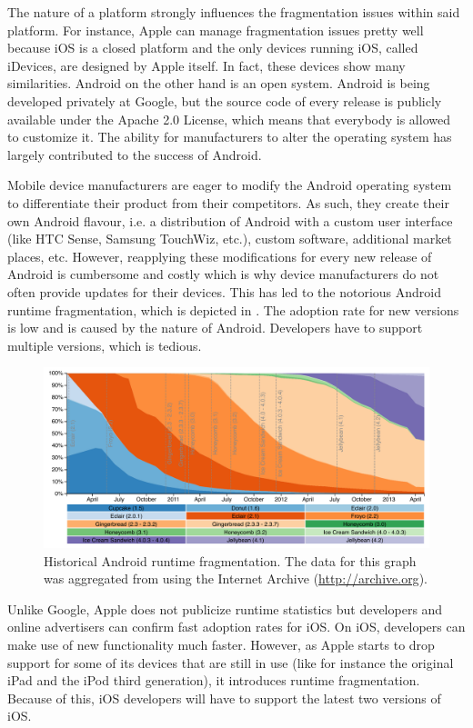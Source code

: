 The nature of a platform strongly influences the fragmentation issues within said platform. For instance, Apple can manage fragmentation issues pretty well because iOS is a closed platform and the only devices running iOS, called iDevices, are designed by Apple itself. In fact, these devices show many similarities. Android on the other hand is an open system. Android is being developed privately at Google, but the source code of every release is publicly available under the Apache 2.0 License, which means that everybody is allowed to customize it. The ability for manufacturers to alter the operating system has largely contributed to the success of Android. 

Mobile device manufacturers are eager to modify the Android operating system to differentiate their product from their competitors. As such, they create their own Android flavour, i.e. a distribution of Android with a custom user interface (like HTC Sense, Samsung TouchWiz, etc.), custom software, additional market places, etc. However, reapplying these modifications for every new release of Android is cumbersome and costly which is why device manufacturers do not often provide updates for their devices. This has led to the notorious Android runtime fragmentation, which is depicted in . The adoption rate for new versions is low and is caused by the nature of Android. Developers have to support multiple versions, which is tedious. 

\begin{figure}[h]
    \centering
    \includegraphics[width=\textwidth]{figs/android_runtimes.pdf}
    \caption{Historical Android runtime fragmentation. The data for this graph was aggregated from \cite{Android:Versions} using the Internet Archive (\url{http://archive.org}).}
    \label{fig:android_runtimes}
\end{figure}

Unlike Google, Apple does not publicize runtime statistics but developers \cite{Smith:2013} and online advertisers \cite{Chitika:2013} can confirm fast adoption rates for iOS. On iOS, developers can make use of new functionality much faster. However, as Apple starts to drop support for some of its devices that are still in use (like for instance the original iPad and the iPod third generation), it introduces runtime fragmentation. Because of this, iOS developers will have to support the latest two versions of iOS.

